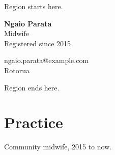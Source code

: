 \documentclass[10pt,a4paper]{article}
\begin{document}
Region starts here.

\begin{minipage}{0.5\linewidth}
\textbf{Ngaio Parata}\\
Midwife\\
Registered since 2015
\end{minipage}
\begin{minipage}{0.45\linewidth}
\raggedleft
ngaio.parata@example.com\\
Rotorua
\end{minipage}

Region ends here.

\section{Practice}
Community midwife, 2015 to now.
\end{document}
